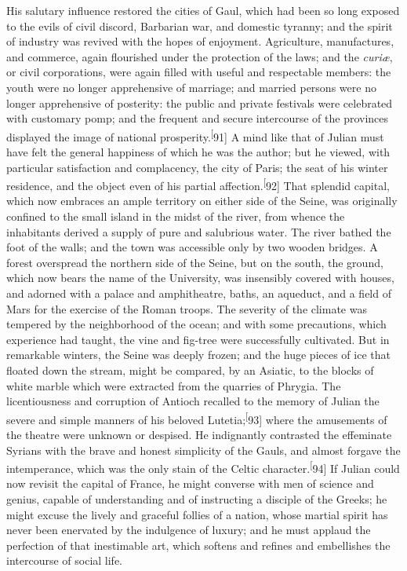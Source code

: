 His salutary influence restored the cities of Gaul, which had
been so long exposed to the evils of civil discord, Barbarian
war, and domestic tyranny; and the spirit of industry was revived
with the hopes of enjoyment. Agriculture, manufactures, and
commerce, again flourished under the protection of the laws; and
the \textit{curiæ}, or civil corporations, were again filled with useful
and respectable members: the youth were no longer apprehensive of
marriage; and married persons were no longer apprehensive of
posterity: the public and private festivals were celebrated with
customary pomp; and the frequent and secure intercourse of the
provinces displayed the image of national prosperity.\textsuperscript[91] A mind
like that of Julian must have felt the general happiness of which
he was the author; but he viewed, with particular satisfaction
and complacency, the city of Paris; the seat of his winter
residence, and the object even of his partial affection.\textsuperscript[92] That
splendid capital, which now embraces an ample territory on either
side of the Seine, was originally confined to the small island in
the midst of the river, from whence the inhabitants derived a
supply of pure and salubrious water. The river bathed the foot of
the walls; and the town was accessible only by two wooden
bridges. A forest overspread the northern side of the Seine, but
on the south, the ground, which now bears the name of the
University, was insensibly covered with houses, and adorned with
a palace and amphitheatre, baths, an aqueduct, and a field of
Mars for the exercise of the Roman troops. The severity of the
climate was tempered by the neighborhood of the ocean; and with
some precautions, which experience had taught, the vine and
fig-tree were successfully cultivated. But in remarkable winters,
the Seine was deeply frozen; and the huge pieces of ice that
floated down the stream, might be compared, by an Asiatic, to the
blocks of white marble which were extracted from the quarries of
Phrygia. The licentiousness and corruption of Antioch recalled to
the memory of Julian the severe and simple manners of his beloved
Lutetia;\textsuperscript[93] where the amusements of the theatre were unknown or
despised. He indignantly contrasted the effeminate Syrians with
the brave and honest simplicity of the Gauls, and almost forgave
the intemperance, which was the only stain of the Celtic
character.\textsuperscript[94] If Julian could now revisit the capital of France,
he might converse with men of science and genius, capable of
understanding and of instructing a disciple of the Greeks; he
might excuse the lively and graceful follies of a nation, whose
martial spirit has never been enervated by the indulgence of
luxury; and he must applaud the perfection of that inestimable
art, which softens and refines and embellishes the intercourse of
social life.

